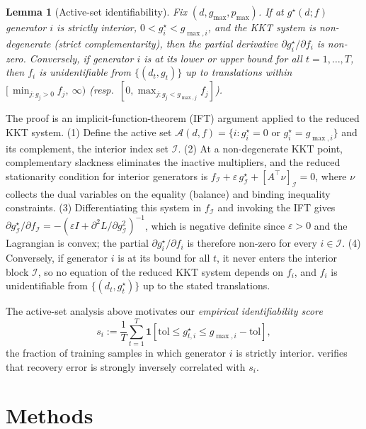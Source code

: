 \documentclass[conference]{IEEEtran}
\newtheorem{lemma}{Lemma}
\newcommand{\opt}{^{\star}}
\begin{document}
\begin{lemma}[Active-set identifiability]
\label{lem:identifiability}
Fix $(d,g_{\max},p_{\max})$. If at $g\opt(d;f)$ generator $i$ is strictly
interior, $0 < g_i\opt < g_{\max,i}$, and the KKT system is non-degenerate
(strict complementarity), then the partial derivative
$\partial g_i\opt/\partial f_i$ is non-zero. Conversely, if generator $i$
is at its lower or upper bound for all $t=1,\dots,T$, then $f_i$ is
unidentifiable from $\{(d_t,g_t)\}$ up to translations within
$[\,\min_{j:g_j>0}f_j,\ \infty)$ (resp.\ $[0,\max_{j:g_j<g_{\max,j}}f_j]$).
\end{lemma}

The proof is an implicit-function-theorem (IFT) argument applied to the
reduced KKT system.
(1) Define the active set
$\mathcal{A}(d,f) = \{i : g_i\opt = 0 \text{ or } g_i\opt = g_{\max,i}\}$
and its complement, the interior index set $\mathcal{I}$.
(2) At a non-degenerate KKT point, complementary slackness eliminates the
inactive multipliers, and the reduced stationarity condition for interior
generators is $f_{\mathcal{I}} + \varepsilon\, g\opt_{\mathcal{I}}
+ [A^{\!\top}\nu]_{\mathcal{I}} = 0$, where $\nu$ collects the dual
variables on the equality (balance) and binding inequality constraints.
(3) Differentiating this system in $f_{\mathcal{I}}$ and invoking the IFT
gives $\partial g\opt_{\mathcal{I}}/\partial f_{\mathcal{I}}
= -(\varepsilon I + \partial^2 L / \partial g_{\mathcal{I}}^2)^{-1}$,
which is negative definite since $\varepsilon > 0$ and the Lagrangian is
convex; the partial $\partial g_i\opt/\partial f_i$ is therefore non-zero
for every $i\in\mathcal{I}$.
(4) Conversely, if generator $i$ is at its bound for all $t$, it never
enters the interior block $\mathcal{I}$, so no equation of the reduced
KKT system depends on $f_i$, and $f_i$ is unidentifiable from
$\{(d_t,g_t\opt)\}$ up to the stated translations.

The active-set analysis above motivates our \emph{empirical identifiability score}
\begin{equation}
s_i := \frac{1}{T}\sum_{t=1}^T \mathbf{1}\!\left[\text{tol}\le g_{t,i}\opt \le g_{\max,i} - \text{tol}\right],
\label{eq:idscore}
\end{equation}
the fraction of training samples in which generator $i$ is strictly
interior.  verifies that recovery error is
strongly inversely correlated with $s_i$.

\section{Methods}
\label{sec:methods}
\end{document}
